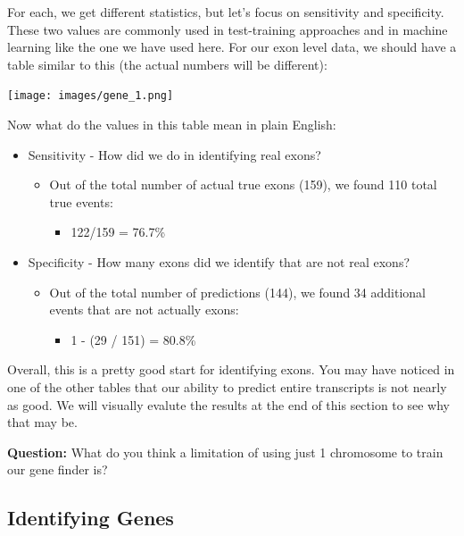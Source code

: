 \documentclass[11pt]{article}
\providecommand{\tightlist}{%
      \setlength{\itemsep}{0pt}\setlength{\parskip}{0pt}}
\begin{document}
For each, we get different statistics, but let's focus on sensitivity
and specificity. These two values are commonly used in test-training
approaches and in machine learning like the one we have used here. For
our exon level data, we should have a table similar to this (the actual
numbers will be different):

\texttt{[image: images/gene\_1.png]}

Now what do the values in this table mean in plain English:

\begin{itemize}
\tightlist
\item
  Sensitivity - How did we do in identifying real exons?

  \begin{itemize}
  \tightlist
  \item
    Out of the total number of actual true exons (159), we found 110
    total true events:

    \begin{itemize}
    \tightlist
    \item
      122/159 = 76.7\%
    \end{itemize}
  \end{itemize}
\item
  Specificity - How many exons did we identify that are not real exons?

  \begin{itemize}
  \tightlist
  \item
    Out of the total number of predictions (144), we found 34 additional
    events that are not actually exons:

    \begin{itemize}
    \tightlist
    \item
      1 - (29 / 151) = 80.8\%
    \end{itemize}
  \end{itemize}
\end{itemize}

Overall, this is a pretty good start for identifying exons. You may have
noticed in one of the other tables that our ability to predict entire
transcripts is not nearly as good. We will visually evalute the results
at the end of this section to see why that may be.

\textbf{Question:} What do you think a limitation of using just 1
chromosome to train our gene finder is?

    \hypertarget{identifying-genes}{%
\subsection{Identifying Genes}\label{identifying-genes}}
\end{document}
